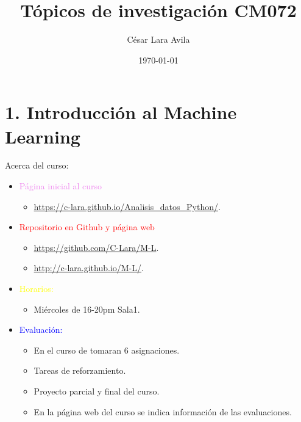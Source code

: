 \documentclass[11pt]{beamer}
\title{T\'opicos de investigaci\'on  CM072}
\date{\today}
\author{C\'esar Lara Avila}
\institute{\url{https://github.com/C-Lara}}
\begin{document}
  \maketitle
  \section{1. Introducci\'on al Machine Learning }
  
\begin{frame}{Acerca del curso:}
	

\begin{itemize}
	\item \textcolor{violet}{P\'agina inicial al curso}
	\begin{itemize}
		\item \url{https://c-lara.github.io/Analisis_datos_Python/}.
	\end{itemize}
	\item  \textcolor{red}{Repositorio en Github y p\'agina web}
	\begin{itemize}
		\item \url{https://github.com/C-Lara/M-L}.
		\item \url{http://c-lara.github.io/M-L/}.
	\end{itemize}
	\item \textcolor{yellow}{Horarios:}
	\begin{itemize}
		\item Mi\'ercoles de 16-20pm Sala1. 
	\end{itemize}
\item \textcolor{blue}{Evaluaci\'on:} 
\begin{itemize}
	\item En el curso de tomaran $6$ asignaciones.
	\item Tareas de reforzamiento.
	\item Proyecto parcial y final del curso. 
	\item En la p\'agina web del curso se indica informaci\'on de las evaluaciones.
\end{itemize}
\end{itemize}
\end{frame}
\end{document}
